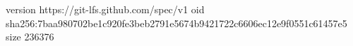 version https://git-lfs.github.com/spec/v1
oid sha256:7baa980702be1c920fe3beb2791e5674b9421722c6606ec12e9f0551c61457e5
size 236376
